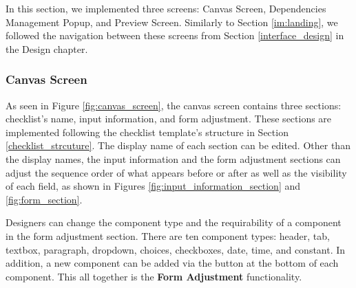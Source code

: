In this section, we implemented three screens: Canvas Screen, Dependencies Management Popup, and Preview Screen. Similarly to Section \ref{im:landing}, we followed the navigation between these screens from Section \ref{interface_design} in the Design chapter.



\subsubsection{Canvas Screen}
\label{im:canvas_screen}


As seen in Figure \ref{fig:canvas_screen}, the canvas screen contains three sections: checklist’s name, input information, and form adjustment. These sections are implemented following the checklist template's structure in Section \ref{checklist_strcuture}. The display name of each section can be edited. Other than the display names, the input information and the form adjustment sections can adjust the sequence order of what appears before or after as well as the visibility of each field, as shown in Figures \ref{fig:input_information_section} and \ref{fig:form_section}.


Designers can change the component type and the requirability of a component in the form adjustment section. There are ten component types: header, tab, textbox, paragraph, dropdown, choices, checkboxes, date, time, and constant. In addition, a new component can be added via the button at the bottom of each component. This all together is the \textbf{Form Adjustment} functionality.

